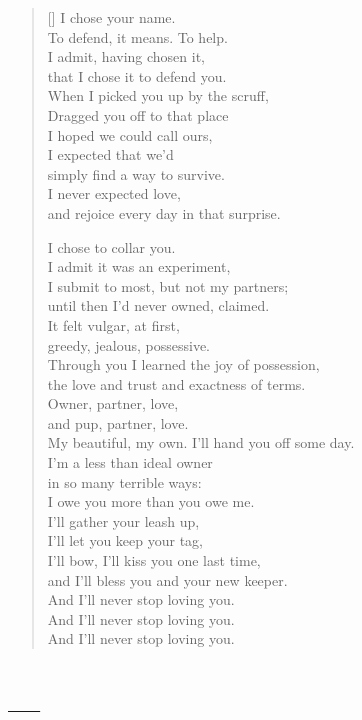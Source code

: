 \begin{verse}[\textwidth]
  I chose your name.\\
  To defend, it means. To help.\\
  I admit, having chosen it,\\
  that I chose it to defend you.\\
  When I picked you up by the scruff,\\
  Dragged you off to that place\\
  I hoped we could call ours,\\
  I expected that we'd\\
  simply find a way to survive.\\
  I never expected love,\\
  and rejoice every day in that surprise.

  I chose to collar you.\\
  I admit it was an experiment,\\
  I submit to most, but not my partners;\\
  until then I'd never owned, claimed.\\
  It felt vulgar, at first,\\
  greedy, jealous, possessive.\\
  Through you I learned the joy of possession,\\
  the love and trust and exactness of terms.\\
  Owner, partner, love,\\
  and pup, partner, love.\\
  My beautiful, my own.
  \newpage
  I'll hand you off some day.\\
  I'm a less than ideal owner\\
  in so many terrible ways:\\
  I owe you more than you owe me.\\
  I'll gather your leash up,\\
  I'll let you keep your tag,\\
  I'll bow, I'll kiss you one last time,\\
  and I'll bless you and your new keeper.\\
  And I'll never stop loving you.\\
  And I'll never stop loving you.\\
  And I'll never stop loving you.
\end{verse}
\newpage

\section{---}

